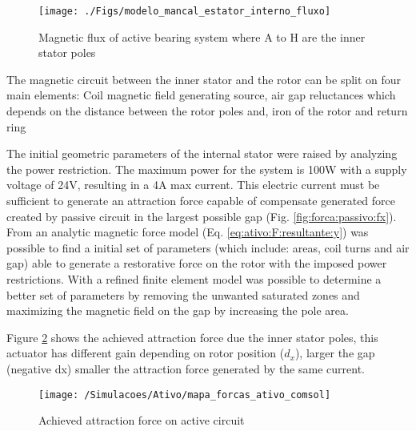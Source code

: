 \documentclass[10pt,fleqn,a4paper,twoside]{article}
\begin{document}
	
	\begin{figure}[ht]
		\centering
		\texttt{[image: ./Figs/modelo\_mancal\_estator\_interno\_fluxo]}
		\caption{Magnetic flux of active bearing system where A to H are the inner stator poles}
		\label{fig:modelo:mancal:estator:interno:fluxo}
	\end{figure}
	
	The magnetic circuit between the inner stator and the rotor can be split on four main elements: Coil magnetic field generating source, air gap reluctances which depends on the distance between the rotor poles and,  iron of the rotor and return ring
	
	The initial geometric parameters of the internal stator were raised by analyzing the power restriction. The maximum power for the system is 100W with a  supply voltage of 24V, resulting in a 4A max current. This electric current must be sufficient to generate an attraction force capable
	of compensate generated force created by passive circuit  in the largest  possible gap (Fig. \ref{fig:forca:passivo:fx}). From an analytic magnetic force model (Eq. \eqref{eq:ativo:F:resultante:y}) was possible to find a initial set of parameters (which include: areas, coil turns and air gap) able to generate a restorative force on the rotor with the imposed power restrictions. With a refined finite element model was possible to determine a better set of parameters by removing the unwanted saturated zones and maximizing the magnetic field on the gap by increasing the pole area. 
	
	Figure \ref{fig:forca:ativo} shows the achieved attraction force due the inner stator poles, this actuator has different gain depending on rotor position ($d_x$), larger the gap (negative dx) smaller the attraction force generated by the same current.
	
		
	\begin{figure}[ht]
		\centering
		
			\texttt{[image: /Simulacoes/Ativo/mapa\_forcas\_ativo\_comsol]}
		\caption{Achieved attraction force on active circuit}
		\label{fig:forca:ativo}
	\end{figure}		
	
\end{document}
